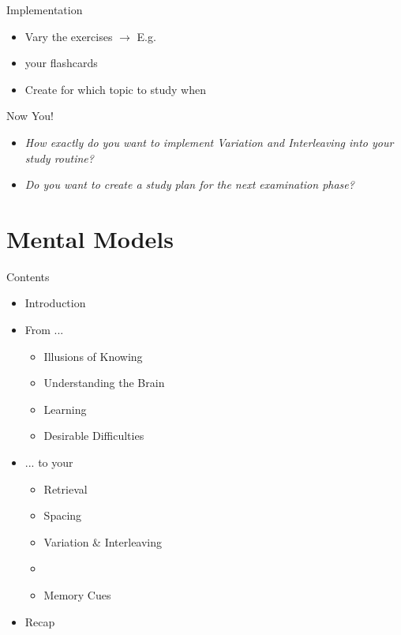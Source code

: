 \documentclass{ercisbeamer}
\begin{document}
\begin{frame}{Implementation}
    \begin{itemize}
        \item Vary the exercises $\rightarrow$ E.g. 
        \item {} your flashcards
        \item Create  for which topic to study when 
    \end{itemize}
\end{frame}

\begin{frame}{Now You!}
    \begin{itemize}
        \item \emph{How exactly do you want to implement Variation and Interleaving into your study routine?}
        \item \emph{Do you want to create a study plan for the next examination phase?}
    \end{itemize}
\end{frame}

\section{Mental Models}
\begin{frame}{Contents}
    \begin{itemize}
        \item Introduction
        \item From ...
        \begin{itemize}
            \item Illusions of Knowing
            \item Understanding the Brain
            \item Learning
            \item Desirable Difficulties
        \end{itemize}
        \item ... to your 
        \begin{itemize}
            \item Retrieval
            \item Spacing
            \item Variation \& Interleaving
            \item {}
            \item Memory Cues
        \end{itemize}
        \item Recap
    \end{itemize}
\end{frame}
\end{document}

